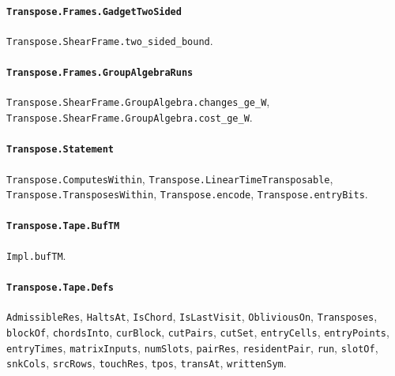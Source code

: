 \paragraph{\texttt{Transpose.Frames.GadgetTwoSided}}
{\small\raggedright \texttt{Transpose.ShearFrame.two\_sided\_bound}.\par}

\paragraph{\texttt{Transpose.Frames.GroupAlgebraRuns}}
{\small\raggedright \texttt{Transpose.ShearFrame.GroupAlgebra.changes\_ge\_W}, \texttt{Transpose.ShearFrame.GroupAlgebra.cost\_ge\_W}.\par}

\paragraph{\texttt{Transpose.Statement}}
{\small\raggedright \texttt{Transpose.ComputesWithin}, \texttt{Transpose.LinearTimeTransposable}, \texttt{Transpose.TransposesWithin}, \texttt{Transpose.encode}, \texttt{Transpose.entryBits}.\par}

\paragraph{\texttt{Transpose.Tape.BufTM}}
{\small\raggedright \texttt{Impl.bufTM}.\par}

\paragraph{\texttt{Transpose.Tape.Defs}}
{\small\raggedright \texttt{AdmissibleRes}, \texttt{HaltsAt}, \texttt{IsChord}, \texttt{IsLastVisit}, \texttt{ObliviousOn}, \texttt{Transposes}, \texttt{blockOf}, \texttt{chordsInto}, \texttt{curBlock}, \texttt{cutPairs}, \texttt{cutSet}, \texttt{entryCells}, \texttt{entryPoints}, \texttt{entryTimes}, \texttt{matrixInputs}, \texttt{numSlots}, \texttt{pairRes}, \texttt{residentPair}, \texttt{run}, \texttt{slotOf}, \texttt{snkCols}, \texttt{srcRows}, \texttt{touchRes}, \texttt{tpos}, \texttt{transAt}, \texttt{writtenSym}.\par}

